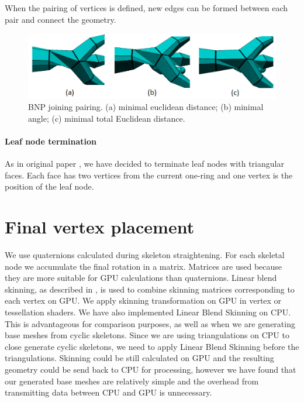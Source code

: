 When the pairing of vertices is defined, new edges can be formed between each pair and connect the geometry.

\begin{figure}[h]
    \centering
    \includegraphics[width=\textwidth]{images/join_pairing.png}
    \caption[BNP joining pairing]{BNP joining pairing. (a) minimal euclidean distance; (b) minimal angle; (c) minimal total Euclidean distance.}
    \label{fig:join_pairing_ilu}
\end{figure}

\paragraph{Leaf node termination}
As in original paper \cite{sqm}, we have decided to terminate leaf nodes with triangular faces. Each face has two vertices from the current one-ring and one vertex is the position of the leaf node.

\section{Final vertex placement}\label{sec:fvp}
We use quaternions calculated during skeleton straightening.
For each skeletal node we accumulate the final rotation in a matrix.
Matrices are used because they are more suitable for GPU calculations than quaternions.
Linear blend skinning, as described in \cite{Kavan-07-SDQ}, is used to combine skinning matrices corresponding to each vertex on GPU.
We apply skinning transformation on GPU in vertex or tessellation shaders.
We have also implemented Linear Blend Skinning on CPU.
This is advantageous for comparison purposes, as well as when we are generating base meshes from cyclic skeletons.
Since we are using triangulations on CPU to close generate cyclic skeletons, we need to apply Linear Blend Skinning before the triangulations.
Skinning could be still calculated on GPU and the resulting geometry could be send back to CPU for processing, however we have found that our generated base meshes are relatively simple and the overhead from transmitting data between CPU and GPU is unnecessary.

